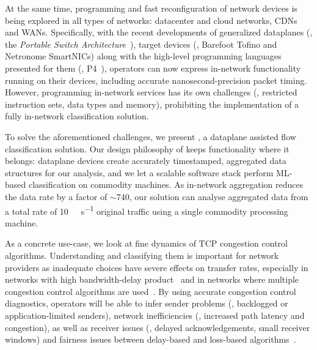 At the same time, programming and fast reconfiguration of network devices is being explored in all types of networks: datacenter and cloud networks, CDNs and WANs.
Specifically, with the recent developments of generalized dataplanes (\eg, the \emph{Portable Switch Architecture}~\parencite{p4-psa}), target devices (\eg, Barefoot Tofino and Netronome SmartNICs) along with the high-level programming languages presented for them (\eg, P4~\parencite{DBLP:journals/ccr/BosshartDGIMRSTVVW14}), operators can now express in-network functionality running on their devices, including accurate nanosecond-precision packet timing.
However, programming in-network services has its own challenges (\eg, restricted instruction sets, data types and memory), prohibiting the implementation of a fully in-network classification solution.


To solve the aforementioned challenges, we present \seidr{}, a dataplane assisted flow classification solution.
Our design philosophy of \seidr{} keeps functionality where it belongs: dataplane devices create accurately timestamped, aggregated data structures for our analysis, and we let a scalable software stack perform ML-based classification on commodity machines.
As in-network aggregation reduces the data rate by a factor of $\sim$\num{740}, our solution can analyse aggregated data from a total rate of \SI{10}{\tera\bit\per\second} original traffic using a single commodity processing machine.

As a concrete use-case, we look at fine dynamics of TCP congestion control algorithms.
Understanding and classifying them is important for network providers as inadequate choices have severe effects on transfer rates, especially in networks with high bandwidth-delay product~\parencite{DBLP:journals/queue/CardwellCGYJ16} and in networks where multiple congestion control algorithms are used~\parencite{DBLP:conf/imc/WareMSS19}. 
By using accurate congestion control diagnostics, operators will be able to infer sender problems (\eg, backlogged or application-limited senders), network inefficiencies (\eg, increased path latency and congestion), as well as receiver issues (\eg, delayed acknowledgements, small receiver windows) and fairness issues between delay-based and loss-based algorithms~\parencite{DBLP:conf/imc/WareMSS19}.

